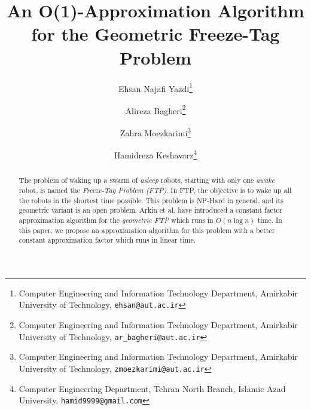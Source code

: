 \documentclass{cccg12}
\title{An O(1)-Approximation Algorithm for the Geometric Freeze-Tag Problem}
\author{
	Ehsan Najafi Yazdi\thanks{Computer Engineering and Information Technology Department, Amirkabir University of Technology, {\tt ehsan@aut.ac.ir}}
	\and
	Alireza Bagheri\thanks{Computer Engineering and Information Technology Department, Amirkabir University of Technology, {\tt ar\_bagheri@aut.ac.ir}}
	\and
	Zahra Moezkarimi\thanks{Computer Engineering and Information Technology Department, Amirkabir University of Technology, {\tt zmoezkarimi@aut.ac.ir}}
	\and
	Hamidreza Keshavarz\thanks{Computer Engineering Department, Tehran North Branch, Islamic Azad University, {\tt hamid9999@gmail.com}}}
\begin{document}
\thispagestyle{empty}
\maketitle


\begin{abstract}
The problem of waking up a swarm of \textit{asleep} robots, starting with only one \textit{awake} robot, is named the \textit{Freeze-Tag Problem (FTP)}. In FTP, the objective is to wake up all the robots in the shortest time possible. This problem is NP-Hard in general, and its geometric variant is an open problem. Arkin et al. have introduced a constant factor approximation algorithm for the \textit{geometric FTP}  which runs in ${ O(n\log n) }$ time. In this paper, we propose an approximation algorithm for this problem with a better constant approximation factor which runs in linear time.
\end{abstract}
\end{document}
